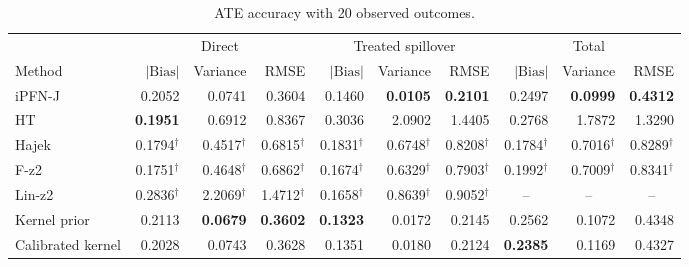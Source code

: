 \begin{table}[tb]
\centering
\caption{ATE accuracy with 20 observed outcomes.}
\begingroup\footnotesize
\setlength{\tabcolsep}{3pt}
\begin{tabular*}{\linewidth}{@{\extracolsep{\fill}}l*{9}{r}@{}}
\toprule
&\multicolumn{3}{c}{Direct}&\multicolumn{3}{c}{Treated spillover}&\multicolumn{3}{c}{Total}\\
\cmidrule(lr){2-4}\cmidrule(lr){5-7}\cmidrule(lr){8-10}
Method&$|\mathrm{Bias}|$&Variance&RMSE&$|\mathrm{Bias}|$&Variance&RMSE&$|\mathrm{Bias}|$&Variance&RMSE\\
\midrule
iPFN-J & \cellcolor{blue!11}0.2052 & \cellcolor{blue!17}0.0741 & \cellcolor{blue!17}0.3604 & \cellcolor{blue!11}0.1460 & \cellcolor{blue!24}\textbf{0.0105} & \cellcolor{blue!24}\textbf{0.2101} & \cellcolor{blue!17}0.2497 & \cellcolor{blue!24}\textbf{0.0999} & \cellcolor{blue!24}\textbf{0.4312} \\
HT & \cellcolor{blue!24}\textbf{0.1951} & \cellcolor{blue!7}0.6912 & \cellcolor{blue!7}0.8367 & \cellcolor{blue!7}0.3036 & \cellcolor{blue!7}2.0902 & \cellcolor{blue!7}1.4405 & \cellcolor{blue!7}0.2768 & \cellcolor{blue!7}1.7872 & \cellcolor{blue!7}1.3290 \\
Hajek & 0.1794$^{\dagger}$ & 0.4517$^{\dagger}$ & 0.6815$^{\dagger}$ & 0.1831$^{\dagger}$ & 0.6748$^{\dagger}$ & 0.8208$^{\dagger}$ & 0.1784$^{\dagger}$ & 0.7016$^{\dagger}$ & 0.8289$^{\dagger}$ \\
F-z2 & 0.1751$^{\dagger}$ & 0.4648$^{\dagger}$ & 0.6862$^{\dagger}$ & 0.1674$^{\dagger}$ & 0.6329$^{\dagger}$ & 0.7903$^{\dagger}$ & 0.1992$^{\dagger}$ & 0.7009$^{\dagger}$ & 0.8341$^{\dagger}$ \\
Lin-z2 & 0.2836$^{\dagger}$ & 2.2069$^{\dagger}$ & 1.4712$^{\dagger}$ & 0.1658$^{\dagger}$ & 0.8639$^{\dagger}$ & 0.9052$^{\dagger}$ & \multicolumn{1}{c}{--} & \multicolumn{1}{c}{--} & \multicolumn{1}{c}{--} \\
Kernel prior & \cellcolor{blue!7}0.2113 & \cellcolor{blue!24}\textbf{0.0679} & \cellcolor{blue!24}\textbf{0.3602} & \cellcolor{blue!24}\textbf{0.1323} & \cellcolor{blue!17}0.0172 & \cellcolor{blue!11}0.2145 & \cellcolor{blue!11}0.2562 & \cellcolor{blue!17}0.1072 & \cellcolor{blue!11}0.4348 \\
Calibrated kernel & \cellcolor{blue!17}0.2028 & \cellcolor{blue!11}0.0743 & \cellcolor{blue!11}0.3628 & \cellcolor{blue!17}0.1351 & \cellcolor{blue!11}0.0180 & \cellcolor{blue!17}0.2124 & \cellcolor{blue!24}\textbf{0.2385} & \cellcolor{blue!11}0.1169 & \cellcolor{blue!17}0.4327 \\

\end{tabular*}
\end{table}
